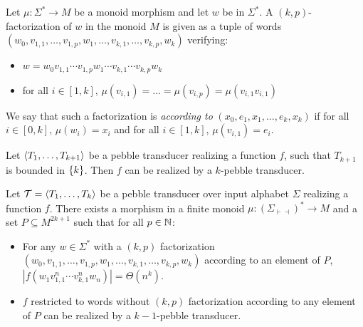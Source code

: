 
\begin{definition}
    Let $\mu:\Sigma^*\rightarrow M$ be a monoid morphism and let $w$ be in $ \Sigma^*$.
    A $(k,p)$-factorization of $w$ in the monoid $M$ is given as a tuple of words $(w_0,v_{1,1},\ldots,v_{1,p},w_1,\ldots,v_{k,1},\ldots,v_{k,p}, w_k)$ verifying:
    \begin{itemize}   
        \item  $w=w_0v_{1,1}\cdots v_{1,p}w_1\cdots v_{k,1}\cdots v_{k,p} w_k$
        \item for all $i\in [1,k]$, $\mu(v_{i,1})=\ldots=\mu(v_{i,p})=\mu(v_{i,1}v_{i,1})$
    \end{itemize}
    We say that such a factorization is \emph{according to} $(x_0,e_1,x_1,\ldots,e_k,x_k)$ if for all $i\in [0,k]$, $\mu(w_i)=x_i$ and for all $i\in [1,k]$, $\mu(v_{i,1})=e_i$.
\end {definition}


\begin{comment}
\begin{lemma}
Let $\Tt=\tuple{T_k,\ldots,T_1}$ be a $k$-pebble transducer over input alphabet $\Sigma$.
One can obtain a new $k$-pebble transducer $\Tt'=\tuple{T_k',\ldots,T_1'}$ over $\Sigma'=\Sigma\times L $ such that:
\begin{itemize}
\item for any $w\in \Sigma'^*$, $\Tt'(w)=\Tt\circ\pi_{\Sigma}(w)$
\item For any $\bigcup_{j<k} Q_j'$-producing triple $(w_1,w_2,w_3)$, we have $\Tt'(w_1w_2^kw_3)=\Theta(|w_2|^k)$
\end{itemize}

\end{lemma}
\end{comment}

\begin{lemma}  
    Let $\langle T_1,\ldots,T_{k+1} \rangle$ be a pebble transducer realizing a function $f$, such that $T_{k+1}$ is bounded in $\{k\}$. Then $f$ can be realized by a $k$-pebble transducer.
\end{lemma}     

\begin{lemma}\label{lem:name}
    Let ${\mathcal T}=\langle T_1,\ldots,T_k \rangle$ be a pebble transducer over input alphabet $\Sigma$ realizing a function $f$.
    There exists a morphism in a finite monoid $\mu:(\Sigma_{\vdash\dashv})^*\rightarrow M$ and a set $P\subseteq M^{2k+1}$ such that for all $p\in \mathbb{N}$:
    \begin{itemize}
    \item For any $w\in \Sigma^*$ with a $(k,p)$ factorization 
       $(w_0,v_{1,1},\ldots,v_{1,p},w_1,\ldots,v_{k,1},\ldots,v_{k,p}, w_k)$ according to an element of $P$, $|f(w_1v_{1,1}^n\cdots v_{k,1}^nw_n)|=\Theta(n^k)$.
    \item $f$ restricted to words without $(k,p)$ factorization according to any element of $P$ can be realized by a $k{-}1$-pebble transducer.
    \end{itemize}
    
\end{lemma}



